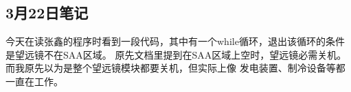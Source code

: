 
\subsection{3月22日笔记}
今天在读张鑫的程序时看到一段代码，其中有一个while循环，退出该循环的条件是望远镜不在SAA区域。
原先文档里提到在SAA区域上空时，望远镜必需关机。而我原先以为是整个望远镜模块都要关机，但实际上像
发电装置、制冷设备等都一直在工作。



